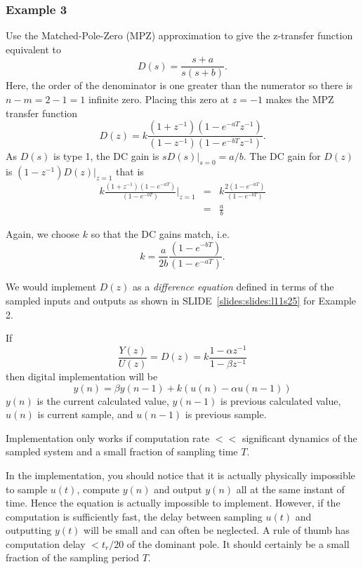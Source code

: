 \subsubsection*{Example 3}

Use the Matched-Pole-Zero (MPZ) approximation to give the z-transfer function equivalent to
$$D(s)=\frac{s+a}{s(s+b)}.$$ Here, the order of the denominator is one greater than the numerator so there is $n-m = 2 - 1 = 1$ infinite zero. Placing this zero at $z = -1$ makes the MPZ transfer function $$D(z)=k\frac{(1+z^{-1})(1-e^{-aT}z^{-1})}{(1-z^{-1})(1 - e^{-bT}z^{-1})}.$$ As $D(s)$ is type 1, the DC gain is $sD(s)|_{s=0} = a/b$. The DC gain for $D(z)$ is $(1-z^{-1})D(z)|_{z=1}$ that is
\begin{eqnarray*}
k\frac{(1+z^{-1})(1-e^{-aT})}{(1-e^{-bT})}|_{z=1} & = & k\frac{2(1-e^{-aT})}{(1-e^{-bT})} \\
        & = & \frac{a}{b}
\end{eqnarray*}

Again, we choose $k$ so that the DC gains match, i.e. $$k = \frac{a}{2b}\frac{(1-e^{-bT})}{(1-e^{-aT})}.$$

We would implement $D(z)$ as a \emph{difference equation} defined in terms of the sampled inputs and outputs as shown in SLIDE~\ref{slides:slides:l11s25} for Example 2.
\begin{slide}\label{slides:l11s25}
	If $$\frac{Y(z)}{U(z)}=D(z)=k\frac{1-\alpha z^{-1}}{1-\beta z^{-1}}$$ then digital implementation will be
	$$y(n)=\beta y(n-1)+k(u(n)-\alpha u(n-1))$$
	$y(n)$ is the current calculated value, $y(n-1)$ is previous calculated value, $u(n)$ is current sample, and $u(n-1)$ is previous sample.

	Implementation only works if computation rate $<<$ significant dynamics of the sampled system and a small fraction of sampling time $T$.
\end{slide}

In the implementation, you should notice that it is actually physically impossible to sample $u(t)$, compute $y(n)$ and output $y(n)$ all at the same instant of time. Hence the equation is actually impossible to implement. However, if the computation is sufficiently fast, the delay between sampling $u(t)$ and outputting $y(t)$ will be small and can often be neglected.  A rule of thumb has computation delay $< t_r/20$ of the dominant pole. It should certainly be a small fraction of the sampling period $T$.

